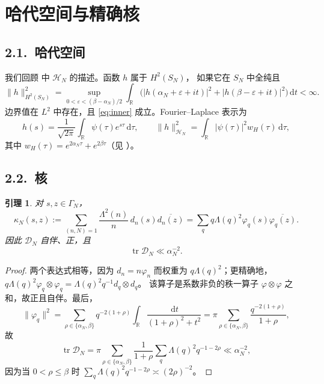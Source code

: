\documentclass[12pt,a4paper]{amsart}
\numberwithin{equation}{section}
\theoremstyle{plain}
\newtheorem{lemma}[theorem]{引理}
\theoremstyle{definition}
\newcommand{\dd}{\,\mathrm{d}}
\newcommand{\eps}{\varepsilon}
\begin{document}
\section{哈代空间与精确核}\label{sec:kernel}

\subsection*{2.1.\ 哈代空间}

我们回顾 \cite[\S5]{LL} 中 $\mathcal H_N$ 的描述。函数 $h$ 属于 $H^2(S_N)$，
如果它在 $S_N$ 中全纯且
\[
 \|h\|^2_{H^2(S_N)}
 =\sup_{0<\eps<(\beta-\alpha_N)/2}
 \int_{\mathbb R}\bigl(|h(\alpha_N+\eps+it)|^2+|h(\beta-\eps+it)|^2\bigr)\dd t<\infty .
\]
边界值在 $L^2$ 中存在，且 \eqref{eq:inner} 成立。Fourier--Laplace 表示为
\begin{equation}\label{eq:PW}
 h(s)=\frac1{\sqrt{2\pi}}\int_{\mathbb R}\psi(\tau)e^{s\tau}\dd\tau,
 \qquad
 \|h\|^2_{\mathcal H_N}=\int_{\mathbb R}|\psi(\tau)|^2w_H(\tau)\dd\tau,
\end{equation}
其中 $w_H(\tau)=e^{2\alpha_N\tau}+e^{2\beta\tau}$（见 \cite[引理 5.2]{LL}）。

\subsection*{2.2.\ 核}

\begin{lemma}\label{lem:kernel}
对 $s,z\in\Gamma_N$，
\begin{equation}\label{eq:kernel}
 \kappa_N(s,z):=\sum_{(n,N)=1}\frac{\Lambda^2(n)}{n}\,d_n(s)\overline{d_n(z)}
 =\sum_q q\Lambda(q)^2\varphi_q(s)\overline{\varphi_q(z)} .
\end{equation}
因此 $\mathcal D_N$ 自伴、正，且
\begin{equation}\label{eq:trace}
 \operatorname{tr}\mathcal D_N\ll\alpha_N^{-2}.
\end{equation}
\end{lemma}

\begin{proof}
两个表达式相等，因为 $d_n=n\varphi_n$ 而权重为 $q\Lambda(q)^2$；更精确地，
$q\Lambda(q)^2\varphi_q\otimes\varphi_q=\Lambda(q)^2q^{-1}d_q\otimes d_q$。
该算子是系数非负的秩一算子 $\varphi\otimes\varphi$ 之和，故正且自伴。最后，
\[
 \|\varphi_q\|^2=\sum_{\rho\in\{\alpha_N,\beta\}}q^{-2(1+\rho)}
 \int_{\mathbb R}\frac{\dd t}{(1+\rho)^2+t^2}
 =\pi\sum_{\rho\in\{\alpha_N,\beta\}}\frac{q^{-2(1+\rho)}}{1+\rho},
\]
故
\[
 \operatorname{tr}\mathcal D_N
 =\pi\sum_{\rho\in\{\alpha_N,\beta\}}\frac1{1+\rho}
 \sum_q\Lambda(q)^2q^{-1-2\rho}\ll\alpha_N^{-2},
\]
因为当 $0<\rho\le\beta$ 时 $\sum_q\Lambda(q)^2q^{-1-2\rho}\asymp(2\rho)^{-2}$。
\end{proof}
\end{document}
